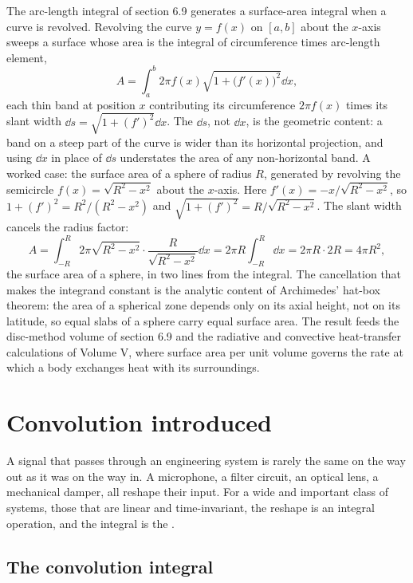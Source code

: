 The arc-length integral of section 6.9 generates a surface-area
integral when a curve is revolved. Revolving the curve $y = f(x)$ on
$[a, b]$ about the $x$-axis sweeps a surface whose area is the integral
of circumference times arc-length element,
\[
A = \int_{a}^{b} 2\pi f(x)\sqrt{1 + \bigl(f'(x)\bigr)^{2}}\dd x,
\]
each thin band at position $x$ contributing its circumference $2\pi
f(x)$ times its slant width $\dd s = \sqrt{1 + (f')^{2}}\dd x$. The
$\dd s$, not $\dd x$, is the geometric content: a band on a steep part
of the curve is wider than its horizontal projection, and using
$\dd x$ in place of $\dd s$ understates the area of any non-horizontal
band. A worked case: the surface area of a sphere of radius $R$,
generated by revolving the semicircle $f(x) = \sqrt{R^{2} - x^{2}}$
about the $x$-axis. Here $f'(x) = -x/\sqrt{R^{2} - x^{2}}$, so $1 +
(f')^{2} = R^{2}/(R^{2} - x^{2})$ and $\sqrt{1 + (f')^{2}} =
R/\sqrt{R^{2} - x^{2}}$. The slant width cancels the radius factor:
\[
A = \int_{-R}^{R} 2\pi\sqrt{R^{2} - x^{2}}\cdot\frac{R}{\sqrt{R^{2}
- x^{2}}}\dd x = 2\pi R\int_{-R}^{R}\dd x = 2\pi R\cdot 2R = 4\pi
R^{2},
\]
the surface area of a sphere, in two lines from the integral. The
cancellation that makes the integrand constant is the analytic content
of Archimedes' hat-box theorem: the area of a spherical zone depends
only on its axial height, not on its latitude, so equal slabs of a
sphere carry equal surface area. The result feeds the disc-method
volume of section 6.9 and the radiative and convective heat-transfer
calculations of Volume V, where surface area per unit volume governs
the rate at which a body exchanges heat with its surroundings.

\section{Convolution introduced}

A signal that passes through an engineering system is rarely the
same on the way out as it was on the way in. A microphone, a
filter circuit, an optical lens, a mechanical damper, all reshape
their input. For a wide and important class of systems, those that
are linear and time-invariant, the reshape is an integral
operation, and the integral is the .

\subsection{The convolution integral}


